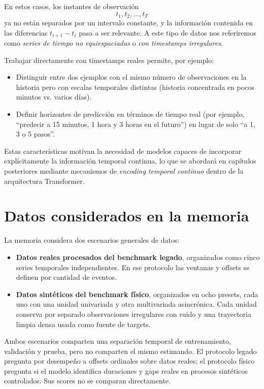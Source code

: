 En estos casos, los instantes de observación
\begin{equation}
    t_1, t_2, \dots, t_T
\end{equation}
ya no están separados por un intervalo constante, y la información contenida en las diferencias $t_{i+1} - t_i$ pasa a ser relevante. A este tipo de datos nos referiremos como \textit{series de tiempo no equiespaciadas} o \textit{con timestamps irregulares}.

\hfill

Trabajar directamente con timestamps reales permite, por ejemplo:
\begin{itemize}
    \item Distinguir entre dos ejemplos con el mismo número de observaciones en la historia pero con escalas temporales distintas (historia concentrada en pocos minutos vs. varios días).
    \item Definir horizontes de predicción en términos de tiempo real (por ejemplo, ``predecir a 15 minutos, 1 hora y 3 horas en el futuro'') en lugar de solo ``a 1, 3 o 5 pasos''.
\end{itemize}

Estas características motivan la necesidad de modelos capaces de incorporar explícitamente la información temporal continua, lo que se abordará en capítulos posteriores mediante mecanismos de \textit{encoding temporal continuo} dentro de la arquitectura Transformer.

\section{Datos considerados en la memoria}
\label{sec:datos-considerados}

La memoria considera dos escenarios generales de datos:
\begin{itemize}
    \item \textbf{Datos reales procesados del benchmark legado}, organizados como cinco series temporales independientes. En ese protocolo las ventanas y offsets se definen por cantidad de eventos.
    \item \textbf{Datos sintéticos del benchmark físico}, organizados en ocho presets, cada uno con una unidad univariada y otra multivariada asincrónica. Cada unidad conserva por separado observaciones irregulares con ruido y una trayectoria limpia densa usada como fuente de targets.
\end{itemize}

\hfill

Ambos escenarios comparten una separación temporal de entrenamiento, validación y prueba, pero no comparten el mismo estimando. El protocolo legado pregunta por desempeño a offsets ordinales sobre datos reales; el protocolo físico pregunta si el modelo identifica duraciones y gaps reales en procesos sintéticos controlados. Sus scores no se comparan directamente.

